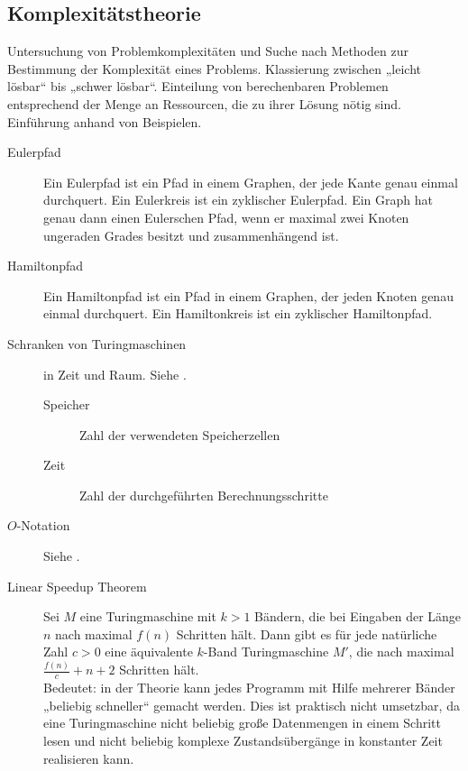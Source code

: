 \subsection{Komplexitätstheorie}
\label{subsec:komplex}
    Untersuchung von Problemkomplexitäten und Suche nach Methoden zur Bestimmung der Komplexität eines Problems. Klassierung zwischen „leicht lösbar“ bis „schwer lösbar“. Einteilung von berechenbaren Problemen entsprechend der Menge an Ressourcen, die zu ihrer Lösung nötig sind. Einführung anhand von Beispielen. 
    \begin{description}
        \item[Eulerpfad] Ein Eulerpfad ist ein Pfad in einem Graphen, der jede Kante genau einmal durchquert. Ein Eulerkreis ist ein zyklischer Eulerpfad. Ein Graph hat genau dann einen Eulerschen Pfad, wenn er maximal zwei Knoten ungeraden Grades besitzt und zusammenhängend ist.
        \item[Hamiltonpfad] Ein Hamiltonpfad ist ein Pfad in einem Graphen, der jeden Knoten genau einmal durchquert. Ein Hamiltonkreis ist ein zyklischer Hamiltonpfad.

        \item[Schranken von Turingmaschinen] in Zeit und Raum. Siehe .
            \begin{description}
                \item[Speicher] Zahl der verwendeten Speicherzellen
                \item[Zeit] Zahl der durchgeführten Berechnungsschritte
            \end{description}

        \item[$O$-Notation] Siehe .
        \item[Linear Speedup Theorem] Sei $M$ eine Turingmaschine mit $k > 1$ Bändern, die bei Eingaben der Länge $n$ nach maximal $f(n)$ Schritten hält. Dann gibt es für jede natürliche Zahl $c > 0$ eine äquivalente $k$-Band Turingmaschine $M'$, die nach maximal $\frac{f(n)}{c} + n + 2$ Schritten hält. \\
        Bedeutet: in der Theorie kann jedes Programm mit Hilfe mehrerer Bänder „beliebig schneller“ gemacht werden. Dies ist praktisch nicht umsetzbar, da eine Turingmaschine nicht beliebig große Datenmengen in einem Schritt lesen und nicht beliebig komplexe Zustandsübergänge in konstanter Zeit realisieren kann.
    \end{description}


